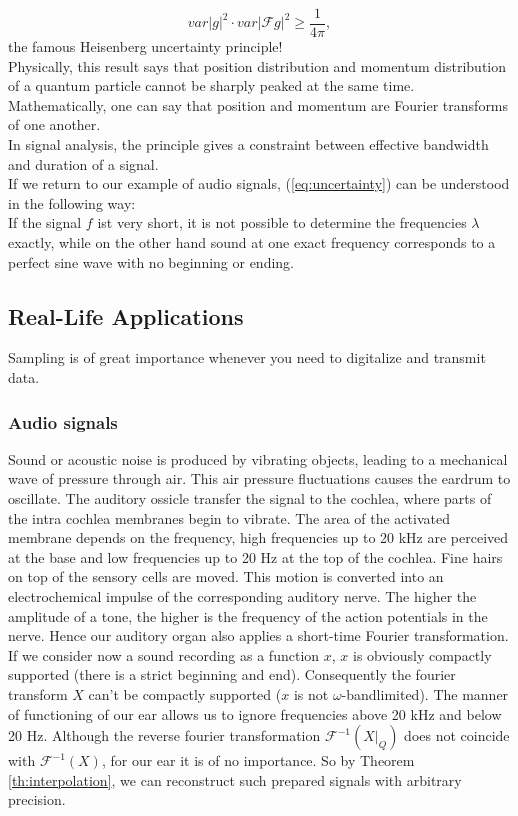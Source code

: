 \documentclass[a4paper, 11pt]{scrreprt}
\newcommand{\FF}{\mathcal{F}}
\begin{document}
	\[var|g|^2 \cdot var|\FF g|^2 \geq \frac{1}{4\pi},\]
the famous Heisenberg uncertainty principle!\\	
Physically, this result says that position distribution and momentum distribution of a quantum particle cannot be sharply peaked at the same time. Mathematically, one can say that position and momentum are Fourier transforms of one another.\\
In signal analysis, the principle gives a constraint between effective bandwidth and duration of a signal.\\
If we return to our example of audio signals, (\ref{eq:uncertainty}) can be understood in the following way:\\
If the signal \(f\) ist very short, it is not possible to determine the frequencies \(\lambda\) exactly, while on the other hand sound at one exact frequency corresponds to a perfect sine wave with no beginning or ending.

\subsection{Real-Life Applications}
\label{se:real-life}
Sampling is of great importance whenever you need to digitalize and transmit data. 
\subsubsection{Audio signals}
Sound or acoustic noise is produced by vibrating objects, leading to a mechanical wave of pressure through air. This air pressure fluctuations causes the eardrum to oscillate. The auditory ossicle transfer the signal to the cochlea, where parts of the intra cochlea membranes begin to vibrate. The area of the activated membrane depends on the frequency, high frequencies up to 20 kHz are perceived at the base and low frequencies up to 20 Hz at the top of the cochlea. Fine hairs on top of the sensory cells are moved. This motion is converted into an electrochemical impulse of the corresponding auditory nerve. The higher the amplitude of a tone, the higher is the frequency of the action potentials in the nerve.
Hence our auditory organ also applies a short-time Fourier transformation. \\

If we consider now a sound recording as a function $x$, $x$ is obviously compactly supported (there is a strict beginning and end). Consequently the fourier transform $X$ can't be compactly supported ($x$ is not $\omega$-bandlimited). The manner of functioning of our ear allows us to ignore frequencies above 20 kHz and below 20 Hz. Although the reverse fourier transformation $\FF^{-1}(X|_{Q})$ does not coincide with $\FF^{-1}(X)$, for our ear it is of no importance. So by Theorem \ref{th:interpolation}, we can reconstruct such prepared signals with arbitrary precision. 
\end{document}
